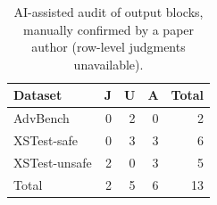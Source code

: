 \begin{table}[t]
\centering
\footnotesize
\setlength{\tabcolsep}{3pt}
\caption{AI-assisted audit of output blocks, manually confirmed by a paper author (row-level judgments unavailable).}
\label{tab:audit}
\begin{tabular}{@{}lrrrr@{}}
\toprule
Dataset & J & U & A & Total \\
\midrule
AdvBench & 0 & 2 & 0 & 2 \\
XSTest-safe & 0 & 3 & 3 & 6 \\
XSTest-unsafe & 2 & 0 & 3 & 5 \\
Total & 2 & 5 & 6 & 13 \\
\bottomrule
\end{tabular}
\end{table}
